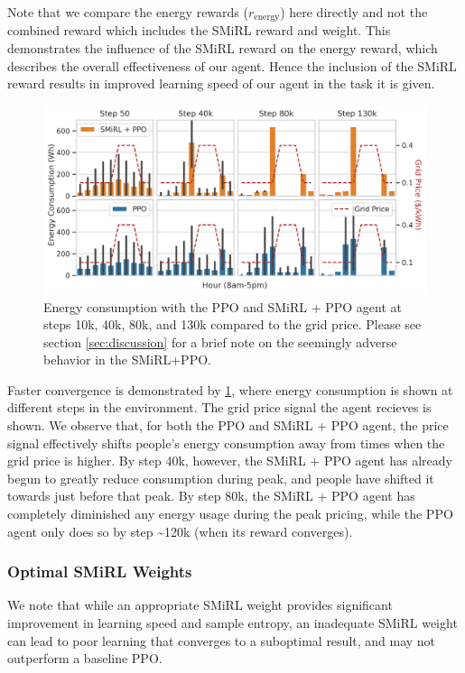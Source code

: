 Note that we compare the energy rewards ($r_\text{energy}$) here directly and not the combined reward which includes the SMiRL reward and weight. This demonstrates the influence of the SMiRL reward on the energy reward, which describes the overall effectiveness of our agent. Hence the inclusion of the SMiRL reward results in improved learning speed of our agent in the task it is given. 
\begin{figure}
    \centering
    \includegraphics[width=\linewidth]{graphics/mmmmfirebrick.png}
    \caption{Energy consumption with the PPO and SMiRL + PPO agent at steps 10k, 40k, 80k, and 130k compared to the grid price. Please see section \ref{sec:discussion} for a brief note on the seemingly adverse behavior in the SMiRL+PPO.}
    \label{fig:observations}
\end{figure}

Faster convergence is demonstrated by \ref{fig:observations}, where energy consumption is shown at different steps in the environment.
The grid price signal the agent recieves is shown. We observe that, for both the PPO and SMiRL + PPO agent, the price signal  effectively shifts people's energy consumption away from times when the grid price is higher.
By step 40k, however, the SMiRL + PPO agent has already begun to greatly reduce consumption during peak, and people have shifted it towards just before that peak.
By step 80k, the SMiRL + PPO agent has completely diminished any energy usage during the peak pricing, while the PPO agent only does so by step \textasciitilde 120k (when its reward converges).



\subsubsection{Optimal SMiRL Weights}
We note that while an appropriate SMiRL weight provides significant improvement in learning speed
and sample entropy, an inadequate SMiRL weight can lead to poor learning that converges to a suboptimal result, and may not outperform a baseline PPO. 

